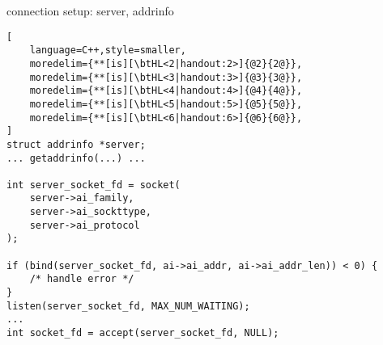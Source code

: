 \begin{frame}[fragile,label=connSetupServerAddrinfo]{connection setup: server, addrinfo}
\begin{lstlisting}[
    language=C++,style=smaller,
    moredelim={**[is][\btHL<2|handout:2>]{@2}{2@}},
    moredelim={**[is][\btHL<3|handout:3>]{@3}{3@}},
    moredelim={**[is][\btHL<4|handout:4>]{@4}{4@}},
    moredelim={**[is][\btHL<5|handout:5>]{@5}{5@}},
    moredelim={**[is][\btHL<6|handout:6>]{@6}{6@}},
]
struct addrinfo *server;
... getaddrinfo(...) ...

int server_socket_fd = socket(
    server->ai_family,
    server->ai_sockttype,
    server->ai_protocol
);

if (bind(server_socket_fd, ai->ai_addr, ai->ai_addr_len)) < 0) {
    /* handle error */
}
listen(server_socket_fd, MAX_NUM_WAITING);
...
int socket_fd = accept(server_socket_fd, NULL);
\end{lstlisting}
\end{frame}

